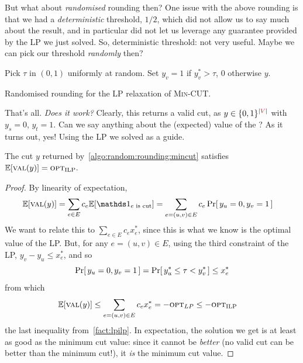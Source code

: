 But what about \emph{randomised} rounding then? One issue with the above rounding is that we had a \emph{deterministic} threshold, $1/2$, which did not allow us to say much about the result, and in particular did not let us leverage any guarantee provided by the LP we just solved. So, deterministic threshold: not very useful. Maybe we can pick our threshold \emph{randomly} then?
\begin{algorithm}[H]
\begin{algorithmic}[1]
    \State Pick $\tau$ in $(0,1)$ uniformly at random.
        \State Set $y_v=1$ if $y^\ast_v > \tau$, $0$ otherwise
    \EndFor
    \State \Return $y$.
\end{algorithmic}
\caption{Randomised rounding for the LP relaxation of \textsc{Min-CUT}.\label{algo:random:rounding:mincut}}
\end{algorithm}
That's all. \emph{Does it work?} Clearly, this returns a valid cut, as $y \in \{0,1\}^{|\textcolor{red}{V}|}$ with $y_s = 0$, $y_t=1$. Can we say anything about the (expected) value of the ? As it turns out, yes! Using the LP we solved as a guide.
\begin{theorem}
    The cut $y$ returned by~\cref{algo:random:rounding:mincut} satisfies $\expect{\val(y)} = \opt_{\rm ILP}.$
\end{theorem}
\begin{proof}
    By linearity of expectation,
    \begin{align*}
    \expect{\val(y)}
    &= \sum_{e\in E} c_e \expect{\indicSet{e \text{ is cut}}}
    = \sum_{e=(u,v)\in E} c_e \probaOf{y_u = 0, y_v = 1}
    \end{align*}
    We want to relate this to $\sum_{e\in E} c_e x^\ast_e$, since this is what we know is the optimal value of the LP. But, for any $e=(u,v)\in E$, using the third constraint of the LP, $y_v - y_u \leq x^\ast_e$, and so
    \[
        \probaOf{y_u = 0, y_v = 1}
        = \probaOf{y^\ast_u \leq \tau < y^\ast_v}
        \leq x^\ast_e
    \]
    from which 
    \begin{align*}
    \expect{\val(y)}
    &\leq \sum_{e=(u,v)\in E} c_e x^\ast_e = -\opt_{{}LP} \leq -\opt_{\rm{}ILP}
    \end{align*}
    the last inequality from~\cref{fact:lpilp}. In expectation, the solution we get is at least as good as the minimum cut value: since it cannot be \emph{better} (no valid cut can be better than the minimum cut!), it \emph{is} the minimum cut value.
\end{proof}

